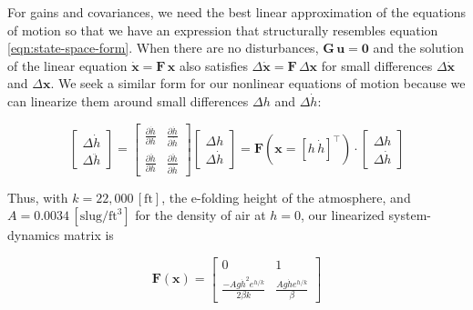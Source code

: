 \documentclass[10pt,oneside,x11names]{article}
\begin{document}
For gains and covariances, we need the best linear approximation of the
equations of motion so that we have an expression that structurally resembles equation
\ref{eqn:state-space-form}. When there are no disturbances,
\(\mathbold{G}\,\mathbold{u}=\mathbold{0}\) and the solution of the linear
equation \(\mathbold{\dot{x}}=\mathbold{F}\,\mathbold{x}\) also satisfies
\(\Delta\mathbold{\dot{x}}=\mathbold{F}\,\Delta\mathbold{x}\) for small
differences \(\Delta\mathbold{\dot{x}}\) and \(\Delta\mathbold{x}\). We seek a
similar form for our nonlinear equations of motion because we can linearize
them around small differences \(\Delta{h}\) and \(\Delta{\dot{h}}\):

\begin{equation}
\begin{bmatrix} \Delta \dot { h } \\ \Delta \ddot { h }
\end{bmatrix}
=
\begin{bmatrix}
\underset {  }{ \frac { \partial \dot { h }  }{ \partial h }  }  &
\underset {  }{ \frac { \partial \dot { h }  }{ \partial \dot { h }  }  }  \\
\frac { \partial \ddot { h }  }{ \partial h }  &
\frac { \partial \ddot { h }  }{ \partial \dot { h }  }
\end{bmatrix}
\begin{bmatrix}
\Delta h \\ \Delta \dot { h }
\end{bmatrix} 
=
\mathbold{F}(\mathbold{x}=[h\,\dot{h}]^\intercal) \cdot
\begin{bmatrix}
\Delta h \\ \Delta \dot { h }
\end{bmatrix} 
\end{equation}

\noindent 
Thus, with
\(k=22,000\,\left[\textrm{ft}\right]\), the e-folding height of the atmosphere,
and \(A=0.0034\,[\textrm{slug}/{{\textrm{ft}}^3}]\) for the density of
air\footnotemark[7]{} at \(h=0\),
our linearized system-dynamics matrix is

\begin{equation}
\mathbold{F}(\mathbold{x}) =
\begin{bmatrix}
\underset {  }{ 0 }  &
\underset {  }{ 1 }  \\
\frac{-A g {\dot{h}}^2 e^{{h}/{k}}}{2 \beta  k}  &
\frac{A g {\dot{h}} e^{{h}/{k}}}{\beta }
\end{bmatrix}
\end{equation}
\end{document}
